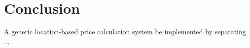 \graphicspath{{Chapter7/Figs/Vector/}{Chapter7/Figs/}}

%
\chapter{Conclusion}
A generic location-based price calculation system be implemented by separating ...